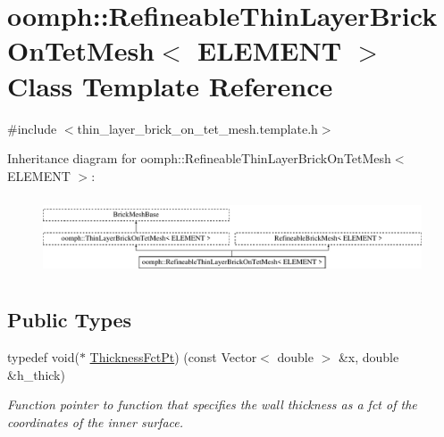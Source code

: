 \hypertarget{classoomph_1_1RefineableThinLayerBrickOnTetMesh}{}\section{oomph\+:\+:Refineable\+Thin\+Layer\+Brick\+On\+Tet\+Mesh$<$ E\+L\+E\+M\+E\+NT $>$ Class Template Reference}
\label{classoomph_1_1RefineableThinLayerBrickOnTetMesh}


{\ttfamily \#include $<$thin\+\_\+layer\+\_\+brick\+\_\+on\+\_\+tet\+\_\+mesh.\+template.\+h$>$}

Inheritance diagram for oomph\+:\+:Refineable\+Thin\+Layer\+Brick\+On\+Tet\+Mesh$<$ E\+L\+E\+M\+E\+NT $>$\+:\begin{figure}[H]
\begin{center}
\leavevmode
\includegraphics[height=2.359551cm]{classoomph_1_1RefineableThinLayerBrickOnTetMesh}
\end{center}
\end{figure}
\subsection*{Public Types}
\begin{DoxyCompactItemize}
\item 
typedef void($\ast$ \hyperlink{classoomph_1_1RefineableThinLayerBrickOnTetMesh_a744583cb70486874441d5a748f23168d}{Thickness\+Fct\+Pt}) (const Vector$<$ double $>$ \&x, double \&h\+\_\+thick)
\begin{DoxyCompactList}\small\item\em Function pointer to function that specifies the wall thickness as a fct of the coordinates of the inner surface. \end{DoxyCompactList}\end{DoxyCompactItemize}

